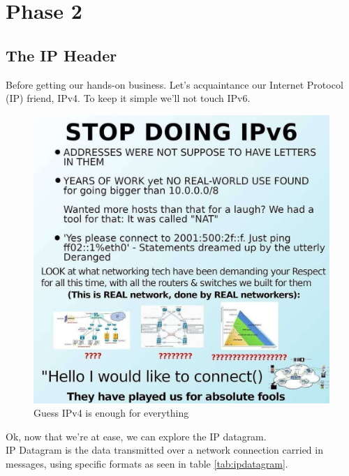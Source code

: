 \documentclass[11pt,a4paper]{report}
\begin{document}
    \setcounter{page}{1}

\chapter{Phase 2}
    \section{The IP Header}
        Before getting our hands-on business. Let's acquaintance our Internet Protocol (IP) friend, IPv4. To keep it simple we'll not touch IPv6.

        \begin{figure}[h]
            \centering
            \includegraphics[scale=0.3]{stopdoingipv6} 
            \caption{Guess IPv4 is enough for everything}
            \label{fig:funnyipv6}
        \end{figure}
        \pagebreak

        Ok, now that we're at ease, we can explore the IP datagram.\\
        IP Datagram is the data transmitted over a network connection carried in messages, using specific formats as seen in table \ref{tab:ipdatagram}.
\end{document}

